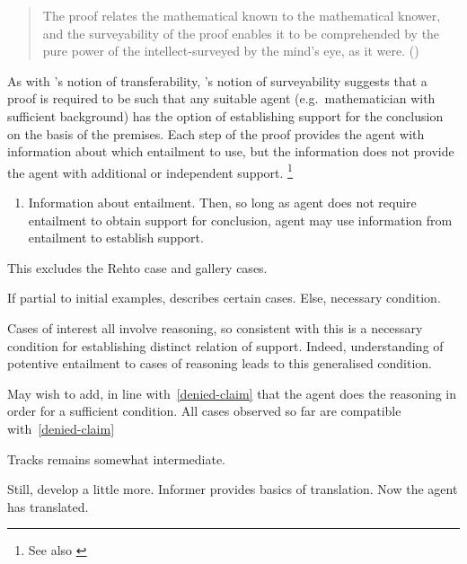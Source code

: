 \begin{note}
\begin{quote}
    The proof relates the mathematical known to the mathematical knower, and the surveyability of the proof enables it to be comprehended by the pure power of the intellect-surveyed by the mind's eye, as it were.\nolinebreak
    \mbox{}\hfill\mbox{(\citeyear[59--60]{Tymoczko:1979tx})}
  \end{quote}
  As with \citeauthor{Easwaran:2009tm}'s notion of transferability, \citeauthor{Tymoczko:1979tx}'s notion of surveyability suggests that a proof is required to be such that any suitable agent (e.g.\ mathematician with sufficient background) has the option of establishing support for the conclusion on the basis of the premises.
  Each step of the proof provides the agent with information about which entailment to use, but the information does not provide the agent with additional or independent support.\nolinebreak
  \footnote{%
    See also \cite{Fallis:2011uc}
    }
\end{note}

\begin{note}[Generalising]
  \begin{enumerate}
  \item\label{general-transferable} Information about entailment.
    Then, so long as agent does not require entailment to obtain support for conclusion, agent may use information from entailment to establish support.
  \end{enumerate}

  This excludes the Rehto case and gallery cases.
  


  If partial to initial examples, describes certain cases.
  Else, necessary condition.

  Cases of interest all involve reasoning, so consistent with this is a necessary condition for establishing distinct relation of support.
  Indeed, understanding of potentive entailment to cases of reasoning leads to this generalised condition.


  May wish to add, in line with~\ref{denied-claim} that the agent does the reasoning in order for a sufficient condition.
  All cases observed so far are compatible with~\ref{denied-claim}
\end{note}

\begin{note}[Tracks]
  Tracks remains somewhat intermediate.
\end{note}

\begin{note}[Translation]
  Still, develop a little more.
  Informer provides basics of translation.
  Now the agent has translated.
\end{note}

